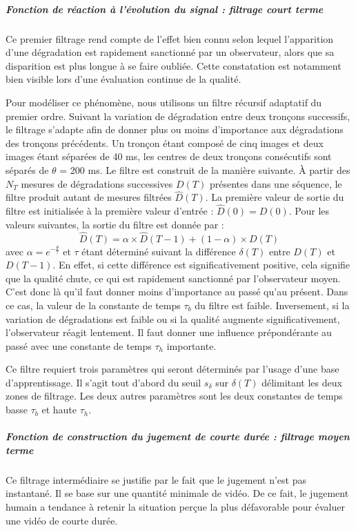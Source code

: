 \subparagraph{Fonction de réaction à l'évolution du signal : filtrage court terme}
Ce premier filtrage rend compte de l'effet bien connu selon lequel l'apparition d'une dégradation est rapidement sanctionné par un observateur, alors que sa disparition est plus longue à se faire oubliée. Cette constatation est notamment bien visible lors d'une évaluation continue de la qualité.

Pour modéliser ce phénomène, nous utilisons un filtre récursif adaptatif du premier ordre. Suivant la variation de dégradation entre deux tronçons successifs, le filtrage s'adapte afin de donner plus ou moins d'importance aux dégradations des tronçons précédents. Un tronçon étant composé de cinq images et deux images étant séparées de 40 ms, les centres de deux tronçons consécutifs sont séparés de $\theta$ = 200 ms. Le filtre est construit de la manière suivante. À partir des $N_T$ mesures de dégradations successives $D(T)$ présentes dans une séquence, le filtre produit autant de mesures filtrées $\hat{D}(T)$. La première valeur de sortie du filtre est initialisée à la première valeur d'entrée : $\hat{D}(0) = D(0)$. Pour les valeurs suivantes, la sortie du filtre est donnée par :
\begin{equation}
\hat{D}(T) = \alpha \times \hat{D}(T-1) + (1 - \alpha) \times D(T)
\end{equation}
%
avec $\alpha = e^{-\frac{\theta}{\tau}}$ et $\tau$ étant déterminé suivant la différence $\delta(T)$ entre $D(T)$ et $D(T-1)$. En effet, si cette différence est significativement positive, cela signifie que la qualité chute, ce qui est rapidement sanctionné par l'observateur moyen. C'est donc là qu'il faut donner moins d'importance au passé qu'au présent. Dans ce cas, la valeur de la constante de temps $\tau_b$ du filtre est faible. Inversement, si la variation de dégradations est faible ou si la qualité augmente significativement, l'observateur réagit lentement. Il faut donner une influence prépondérante au passé avec une constante de temps $\tau_h$ importante.

Ce filtre requiert trois paramètres qui seront déterminés par l'usage d'une base d'apprentissage. Il s'agit tout d'abord du seuil $s_\delta$ sur $\delta(T)$ délimitant les deux zones de filtrage. Les deux autres paramètres sont les deux constantes de temps basse $\tau_b$ et haute $\tau_h$.


\subparagraph{Fonction de construction du jugement de courte durée : filtrage moyen terme}
Ce filtrage intermédiaire se justifie par le fait que le jugement n'est pas instantané. Il se base sur une quantité minimale de vidéo. De ce fait, le jugement humain a tendance à retenir la situation perçue la plus défavorable pour évaluer une vidéo de courte durée.

